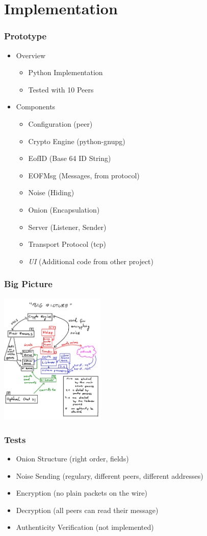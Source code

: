 \documentclass{beamer}
\begin{document}
\section{Implementation}
\frame
{
  \frametitle{Prototype}
  \begin{itemize}
     \item Overview
      \begin{itemize}
          \item Python Implementation
          \item Tested with 10 Peers
      \end{itemize}
      \item Components
      \begin{itemize}
          \item Configuration (peer)
          \item Crypto Engine (python-gnupg)
          \item EofID (Base 64 ID String)
          \item EOFMsg (Messages, from protocol)
          \item Noise (Hiding)
          \item Onion (Encapsulation)
          \item Server (Listener, Sender)
          \item Transport Protocol (tcp)
          \item \textit{UI} (Additional code from other project)
      \end{itemize}
   \end{itemize}
}
\frame
{
  \frametitle{Big Picture}
  \begin{center}
   \includegraphics[width=5cm]{../bigpicture.png}
  \end{center}
}



\frame
{
  \frametitle{Tests}
  \begin{itemize}
          \item Onion Structure (right order, fields)
          \item Noise Sending (regulary, different peers, different addresses)
          \item Encryption (no plain packets on the wire)
          \item Decryption (all peers can read their message)
          \item Authenticity Verification (\alert{not implemented})
   \end{itemize}
}
\end{document}
